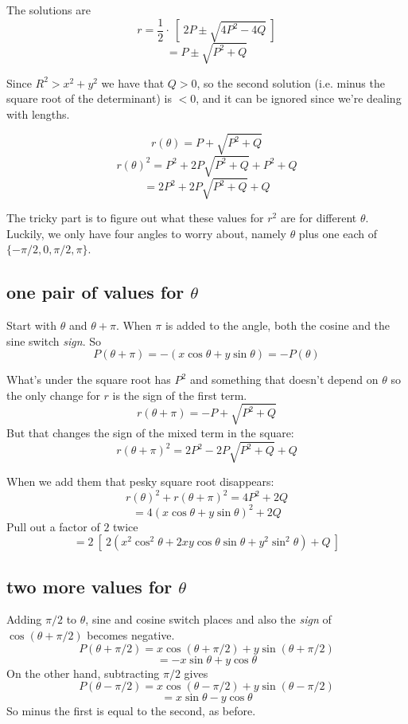 \documentclass[11pt, oneside]{article}
\begin{document}
The solutions are
\[ r = \frac{1}{2} \cdot \ [ \ 2P \pm \sqrt{4P^2 - 4Q} \ ] \]
\[ = P \pm \sqrt{P^2 + Q} \]

Since $R^2 > x^2 + y^2$ we have that $Q > 0$, so the second solution (i.e. minus the square root of the determinant) is $< 0$, and it can be ignored since we're dealing with lengths.

\[ r(\theta) = P + \sqrt{P^2 + Q} \]
\[ r(\theta)^2 = P^2 + 2 P \sqrt{P^2 + Q} + P^2 + Q \]
\[ = 2P^2 + 2 P \sqrt{P^2 + Q} + Q \]

The tricky part is to figure out what these values for $r^2$ are for different $\theta$.  Luckily, we only have four angles to worry about, namely $\theta$ plus one each of  $\{-\pi/2, 0, \pi/2, \pi\}$.

\subsection*{one pair of values for $\theta$}

Start with $\theta$ and $\theta + \pi$.  When $\pi$ is added to the angle, both the cosine and the sine switch \emph{sign}.  So
\[ P(\theta + \pi) = - (x \cos \theta + y \sin \theta) = - P(\theta) \]

What's under the square root has $P^2$ and something that doesn't depend on $\theta$ so the only change for $r$ is the sign of the first term.
\[ r(\theta + \pi) = -P + \sqrt{P^2 + Q} \]
But that changes the sign of the mixed term in the square:
\[  r(\theta + \pi)^2 = 2 P^2 - 2 P \sqrt{P^2 + Q} + Q \]

When we add them that pesky square root disappears:
\[ r(\theta)^2 + r(\theta + \pi)^2 = 4P^2 + 2Q  \] 
\[ = 4 (x \cos \theta + y \sin \theta)^2 + 2Q \]
Pull out a factor of $2$ twice
\[ = 2 \ [ \ 2(x^2 \cos^2 \theta + 2xy \cos \theta \sin \theta + y^2 \sin^2 \theta) + Q \ ] \]

\subsection*{two more values for $\theta$}

Adding $\pi/2$ to $\theta$, sine and cosine switch places and also the \emph{sign} of $\cos(\theta + \pi/2)$ becomes negative.
\[ P(\theta + \pi/2) = x \cos (\theta + \pi/2) + y \sin (\theta + \pi/2) \] 
\[ = - x \sin \theta + y \cos \theta \]
On the other hand, subtracting $\pi/2$ gives
\[ P(\theta - \pi/2) = x \cos (\theta - \pi/2) + y \sin (\theta - \pi/2) \] 
\[ = x \sin \theta - y \cos \theta \]
So minus the first is equal to the second, as before.
\end{document}
